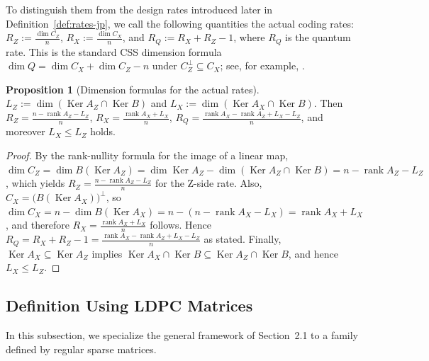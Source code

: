 \documentclass[11pt]{article}
\theoremstyle{definition}
\newtheorem{proposition}[theorem]{Proposition}
\newcommand{\rank}{\operatorname{rank}}
\newcommand{\Ker}{\operatorname{Ker}}
\newcommand{\CZ}{C_Z}
\newcommand{\CX}{C_X}
\begin{document}
To distinguish them from the design rates introduced later in Definition~\ref{def:rates-jp}, we call the following quantities the actual coding rates:
\(R_Z:=\frac{\dim \CZ}{n}\), \(R_X:=\frac{\dim \CX}{n}\), and \(R_Q:=R_X+R_Z-1\),
where \(R_Q\) is the quantum rate. This is the standard CSS dimension formula
\(\dim Q=\dim \CX+\dim \CZ-n\) under \(\CZ^\perp\subseteq \CX\); see, for example,
\cite{CS96,Ste96}.

\begin{proposition}[Dimension formulas for the actual rates]\label{prop:actual-rates-jp}
\(L_Z:=\dim(\Ker A_Z\cap \Ker B)\) and \(L_X:=\dim(\Ker A_X\cap \Ker B)\).
Then \(R_Z=\frac{n-\rank A_Z-L_Z}{n}\), \(R_X=\frac{\rank A_X+L_X}{n}\), \(R_Q=\frac{\rank A_X-\rank A_Z+L_X-L_Z}{n}\), and moreover \(L_X\le L_Z\) holds.
\end{proposition}

\begin{proof}
By the rank-nullity formula for the image of a linear map, \(\dim \CZ=\dim B(\Ker A_Z)=\dim \Ker A_Z-\dim(\Ker A_Z\cap\Ker B)=n-\rank A_Z-L_Z\), which yields \(R_Z=\frac{n-\rank A_Z-L_Z}{n}\) for the Z-side rate.
Also, \(\CX=\bigl(B(\Ker A_X)\bigr)^\perp\), so
\(\dim \CX=n-\dim B(\Ker A_X)=n-(n-\rank A_X-L_X)=\rank A_X+L_X\),
and therefore \(R_X=\frac{\rank A_X+L_X}{n}\) follows.
Hence
\(
R_Q=R_X+R_Z-1=\frac{\rank A_X-\rank A_Z+L_X-L_Z}{n}
\)
as stated.
Finally, \(\Ker A_X\subseteq \Ker A_Z\) implies
\(\Ker A_X\cap\Ker B\subseteq \Ker A_Z\cap\Ker B\),
and hence \(L_X\le L_Z\).
\end{proof}

\subsection{Definition Using LDPC Matrices}

In this subsection, we specialize the general framework of Section~2.1 to a family defined by regular sparse matrices.
\end{document}
